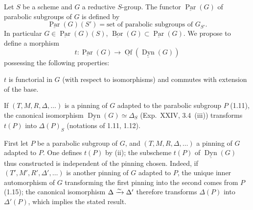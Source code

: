 \label{XXVI.3.2}
Let $S$ be a scheme and $G$ a reductive $S$-group. The functor $\underline{\operatorname{Par}}(G)$ of parabolic subgroups of $G$ is defined by
\[
\underline{\operatorname{Par}}(G)(S')=\text{set of parabolic subgroups of }G_{S'}.
\]
In particular $G\in\underline{\operatorname{Par}}(G)(S)$, $\underline{\operatorname{Bor}}(G)\subset\underline{\operatorname{Par}}(G)$. We propose to define a morphism
\[
t:\underline{\operatorname{Par}}(G)\to\underline{\operatorname{Of}}(\underline{\operatorname{Dyn}}(G))
\]
possessing the following properties:
\begin{enumeratei}
\item $t$ is functorial in $G$ (with respect to isomorphisms) and commutes with extension of the base.
\item If $(T,M,R,\Delta,\ldots)$ is a pinning of $G$ adapted to the parabolic subgroup $P$ (1.11), the canonical isomorphism $\underline{\operatorname{Dyn}}(G)\simeq\Delta_S$ (Exp.~XXIV, 3.4~(iii)) transforms $t(P)$ into $\Delta(P)_S$ (notations of 1.11, 1.12).
\end{enumeratei}
First let $P$ be a parabolic subgroup of $G$, and $(T,M,R,\Delta,\ldots)$ a pinning of $G$ adapted to $P$. One defines $t(P)$ by (ii); the subscheme $t(P)$ of $\underline{\operatorname{Dyn}}(G)$ thus constructed is independent of the pinning chosen. Indeed, if $(T',M',R',\Delta',\ldots)$ is another pinning of $G$ adapted to $P$, the unique inner automorphism of $G$ transforming the first pinning into the second comes from $P$ (1.15); the canonical isomorphism $\Delta\xrightarrow{\sim}\Delta'$ therefore transforms $\Delta(P)$ into $\Delta'(P)$, which implies the stated result.

